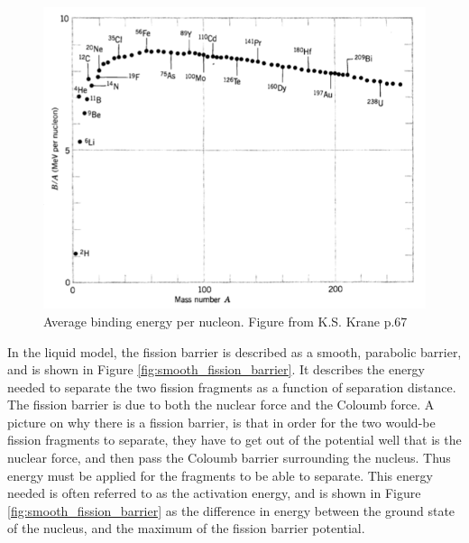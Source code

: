 \documentclass[]{article}
\begin{document}
\begin{figure}
	\centering
	\includegraphics[scale=0.6]{binding_energy_per_nucleon.png}
	\caption{Average binding energy per nucleon. Figure from K.S. Krane p.67 \cite{Krane1988}}
	\label{fig:binding_energy_per_nucleon}
\end{figure}


 \noindent In the liquid model, the fission barrier is described as a smooth, parabolic barrier, and is shown in Figure \ref{fig:smooth_fission_barrier}. It describes the energy needed to separate the two fission fragments as a function of separation distance. The fission barrier is due to both the nuclear force and the Coloumb force. A picture on why there is a fission barrier, is that in order for the two would-be fission fragments to separate, they have to get out of the potential well that is the nuclear force, and then pass the Coloumb barrier surrounding the nucleus. Thus energy must be applied for the fragments to be able to separate. This energy needed is often referred to as the activation energy, and is shown in Figure \ref{fig:smooth_fission_barrier} as the difference in energy between the ground state of the nucleus, and the maximum of the fission barrier potential. 
 
 \par
 \vspace{3mm}
 
\end{document}
